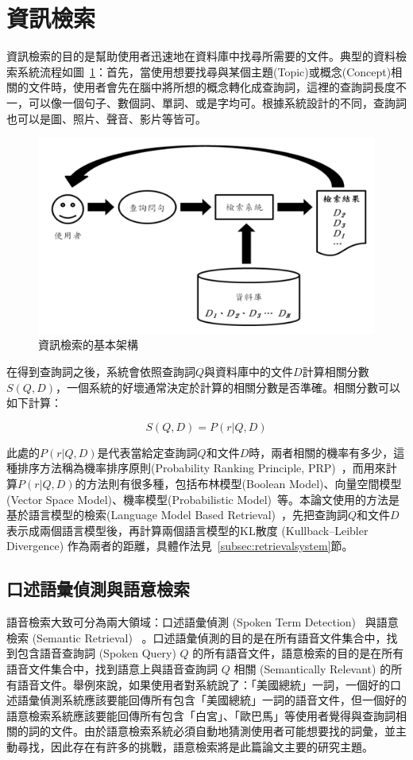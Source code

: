 \section{資訊檢索}
資訊檢索的目的是幫助使用者迅速地在資料庫中找尋所需要的文件。典型的資料檢索系統流程如圖~\ref{fig:chap2_retrieval}：首先，當使用想要找尋與某個主題(Topic)或概念(Concept)相關的文件時，使用者會先在腦中將所想的概念轉化成查詢詞，這裡的查詢詞長度不一，可以像一個句子、數個詞、單詞、或是字均可。根據系統設計的不同，查詢詞也可以是圖、照片、聲音、影片等皆可。
\begin{figure}
\centering
\includegraphics[scale=0.5]{images/chap2_retrieval.png}
\caption{資訊檢索的基本架構} \label{fig:chap2_retrieval}
\end{figure}

在得到查詢詞之後，系統會依照查詢詞$Q$與資料庫中的文件$D$計算相關分數$S(Q, D)$，一個系統的好壞通常決定於計算的相關分數是否準確。相關分數可以如下計算：

\[
S(Q, D) = P(r|Q, D)
\]

此處的$P(r|Q, D)$是代表當給定查詢詞$Q$和文件$D$時，兩者相關的機率有多少，這種排序方法稱為機率排序原則(Probability Ranking Principle, PRP)~\cite{amati2002probabilistic}，而用來計算$P(r|Q, D)$的方法則有很多種，包括布林模型(Boolean Model)、向量空間模型(Vector Space Model)、機率模型(Probabilistic Model)~\cite{robertson1977probability}等。本論文使用的方法是基於語言模型的檢索(Language Model Based Retrieval)~\cite{chia2010statistical}，先把查詢詞$Q$和文件$D$表示成兩個語言模型後，再計算兩個語言模型的KL散度 (Kullback–Leibler Divergence) 作為兩者的距離，具體作法見~\ref{subsec:retrievalsystem}節。
	
\subsection{口述語彙偵測與語意檢索}
語音檢索大致可分為兩大領域：口述語彙偵測 (Spoken Term Detection)~\cite{hazen2009query} 與語意檢索 (Semantic Retrieval)~\cite{lee2012improved} 。口述語彙偵測的目的是在所有語音文件集合中，找到包含語音查詢詞 (Spoken Query) $Q$ 的所有語音文件，語意檢索的目的是在所有語音文件集合中，找到語意上與語音查詢詞 $Q$ 相關 (Semantically Relevant)
的所有語音文件。舉例來說，如果使用者對系統說了：「美國總統」一詞，一個好的口述語彙偵測系統應該要能回傳所有包含「美國總統」一詞的語音文件，但一個好的語意檢索系統應該要能回傳所有包含「白宮」、「歐巴馬」等使用者覺得與查詢詞相關的詞的文件。由於語意檢索系統必須自動地猜測使用者可能想要找的詞彙，並主動尋找，因此存在有許多的挑戰，語意檢索將是此篇論文主要的研究主題。


